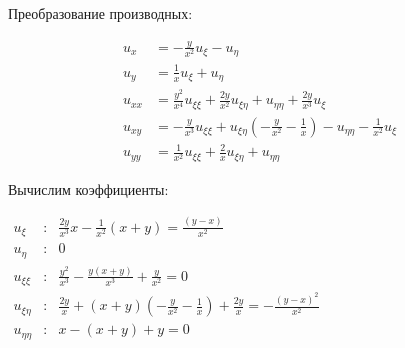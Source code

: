 \documentclass[a4paper,12pt]{article}
\begin{document}
        Преобразование производных:
        
        \begin{align*}
        u_x &= -\frac{y}{x^2} u_{\xi} - u_{\eta} \\
        u_y &=\frac{1}{x} u_{\xi} + u_{\eta} \\
        u_{xx} &= \frac{y^2}{x^4} u_{\xi\xi} + \frac{2y}{x^2} u_{\xi\eta}  + u_{\eta\eta} + \frac{2y}{x^3} u_{\xi} \\
        u_{xy} &= -\frac{y}{x^3} u_{\xi\xi} + u_{\xi\eta} (-\frac{y}{x^2} - \frac{1}{x}) - u_{\eta\eta} - \frac{1}{x^2} u_{\xi} \\
        u_{yy} &= \frac{1}{x^2} u_{\xi\xi} + \frac{2}{x} u_{\xi\eta}  + u_{\eta\eta} 
        \end{align*}
        
        
        Вычислим коэффициенты:
        \begin{flushleft}
        \(
        \begin{array}{rcl}
        u_{\xi} & : & \frac{2y}{x^3}x-\frac{1}{x^2}(x+y)= \frac{(y-x)}{x^2}\\
        u_{\eta} & : & 0 \\
        u_{\xi\xi} & : & \frac{y^2}{x^3}-\frac{y(x+y)}{x^3}+\frac{y}{x^2} = 0\\
        u_{\xi\eta} & : &  \frac{2y}{x}+(x+y)(-\frac{y}{x^2} - \frac{1}{x}) + \frac{2y}{x} = -\frac{(y-x)^2}{x^2}\\
        u_{\eta\eta} & : & x - (x+y) + y = 0
        \end{array}
        \)
        \end{flushleft}
\end{document}
